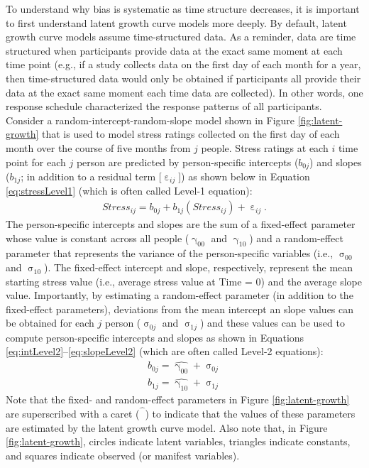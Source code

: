 \documentclass[
12pt, %
twoside,
english]{guelphthesis}
\begin{document}
To understand why bias is systematic as time structure decreases, it is important to first understand latent growth curve models more deeply. By default, latent growth curve models assume time-structured data. As a reminder, data are time structured when participants provide data at the exact same moment at each time point (e.g., if a study collects data on the first day of each month for a year, then time-structured data would only be obtained if participants all provide their data at the exact same moment each time data are collected). In other words, one response schedule characterized the response patterns of all participants. Consider a random-intercept-random-slope model shown in Figure \ref{fig:latent-growth} that is used to model stress ratings collected on the first day of each month over the course of five months from \(j\) people. Stress ratings at each \(i\) time point for each \(j\) person are predicted by person-specific intercepts (\(b_{0j}\)) and slopes (\(b_{1j}\); in addition to a residual term {[}\(\upepsilon_{ij}\){]}) as shown below in Equation \ref{eq:stressLevel1} (which is often called Level-1 equation):
\begin{align}
  Stress_{ij} = b_{0j} + b_{1j}(Stress_{ij}) + \upepsilon_{ij}.
  \label{eq:stressLevel1}
\end{align}
\noindent The person-specific intercepts and slopes are the sum of a fixed-effect parameter whose value is constant across all people (\(\upgamma_{00}\) and \(\upgamma_{10}\)) and a random-effect parameter that represents the variance of the person-specific variables (i.e., \(\upsigma_{00}\) and \(\upsigma_{10}\)). The fixed-effect intercept and slope, respectively, represent the mean starting stress value (i.e., average stress value at Time = 0) and the average slope value. Importantly, by estimating a random-effect parameter (in addition to the fixed-effect parameters), deviations from the mean intercept an slope values can be obtained for each \(j\) person (\(\upsigma_{0j}\) and \(\upsigma_{1j}\)) and these values can be used to compute person-specific intercepts and slopes as shown in Equations \ref{eq:intLevel2}--\ref{eq:slopeLevel2} (which are often called Level-2 equations):
\begin{align}
  b_{0j} = \hat{\upgamma_{00}} + \upsigma_{0j} \label{eq:intLevel2} \\
  b_{1j} = \hat{\upgamma_{10}} + \upsigma_{1j} \label{eq:slopeLevel2}
\end{align}
\noindent Note that the fixed- and random-effect parameters in Figure \ref{fig:latent-growth} are superscribed with a caret (\(\hat{\phantom{\beta}}\)) to indicate that the values of these parameters are estimated by the latent growth curve model. Also note that, in Figure \ref{fig:latent-growth}, circles indicate latent variables, triangles indicate constants, and squares indicate observed (or manifest variables).
\end{document}
